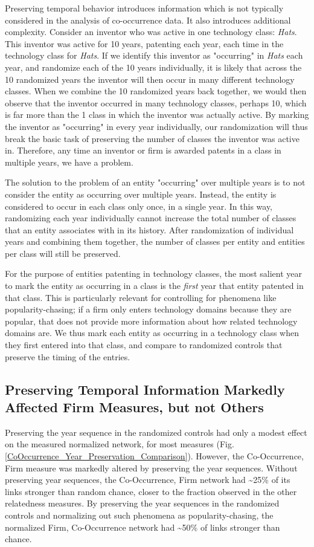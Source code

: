 \documentclass[pre,reprint,groupedaddress,superscriptaddress]{revtex4-1}
\begin{document}
Preserving temporal behavior introduces information which is not typically considered in the analysis of co-occurrence data. It also introduces additional complexity. Consider an inventor who was active in one technology class: \textit{Hats}. This inventor was active for 10 years, patenting each year, each time in the technology class for \textit{Hats}. If we identify this inventor as "occurring" in \textit{Hats} each year, and randomize each of the 10 years individually, it is likely that across the 10 randomized years the inventor will then occur in  many different technology classes. When we combine the 10 randomized years back together, we would then observe that the inventor occurred in many technology classes, perhaps 10, which is far more than the 1 class in which the inventor was actually active. By marking the inventor as "occurring" in every year individually, our randomization will thus break the  basic task of preserving the number of classes the inventor was active in. Therefore, any time an inventor or firm is awarded patents in a class in multiple years, we have a problem.

The solution to the problem of an entity "occurring" over multiple years is to not consider the entity as occurring over multiple years. Instead, the entity is considered to occur in each class only once, in a single year. In this way, randomizing each year individually cannot increase the total number of classes that an entity associates with in its history. After randomization of individual years and combining them together, the number of classes per entity and entities per class will still be preserved. 

For the purpose of entities patenting in technology classes, the most salient year to mark the entity as occurring in a class is the \textit{first} year that entity patented in that class. This is particularly relevant for controlling for phenomena like popularity-chasing; if a firm only enters technology domains because they are popular, that does not provide more information about how related technology domains are. We thus mark each entity as occurring in a technology class when they first entered into that class, and compare to randomized controls that preserve the timing of the entries.

\subsection{Preserving Temporal Information Markedly Affected Firm Measures, but not Others}
Preserving the year sequence in the randomized controls had only a modest effect on the measured normalized network, for most measures (Fig. \ref{CoOccurrence_Year_Preservation_Comparison}). However, the Co-Occurrence, Firm measure was markedly altered by preserving the year sequences. Without preserving year sequences, the Co-Occurrence, Firm network had \textasciitilde{}25\% of its links stronger than random chance, closer to the fraction observed in the other relatedness measures. By preserving the year sequences in the randomized controls and normalizing out such phenomena as popularity-chasing, the normalized Firm, Co-Occurrence network had \textasciitilde{}50\% of links stronger than chance.
\end{document}
